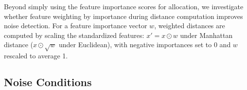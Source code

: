 Beyond simply using the feature importance scores for allocation, we investigate whether feature weighting by importance during distance computation improves noise detection. For a feature importance vector $w$, weighted distances are computed by scaling the standardized features: $x' = x \odot w$ under Manhattan distance ($x \odot \sqrt{w}$ under Euclidean), with negative importances set to 0 and $w$ rescaled to average 1. 


\subsection{Noise Conditions}
